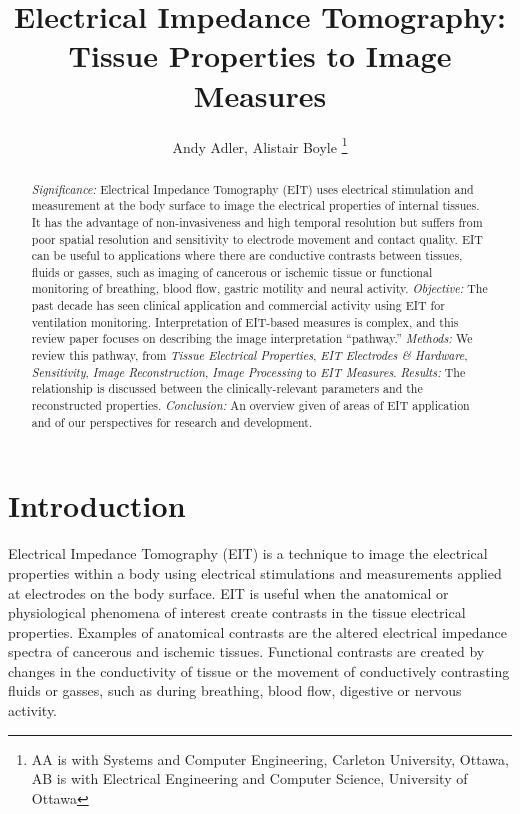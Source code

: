 \documentclass[10pt,journal]{IEEEtran}\def\TBLWIDA{15mm}\def\TBLWIDB{60mm}
\begin{document}
\title{Electrical Impedance Tomography:\\ Tissue Properties to Image Measures}
\author{Andy Adler, Alistair Boyle
\thanks{AA is with Systems and Computer Engineering, Carleton University, Ottawa, AB is with Electrical Engineering and Computer Science, University of Ottawa}
}
\date{}
\maketitle

\begin{abstract}
\emph{Significance:}
Electrical Impedance Tomography (EIT) uses electrical
stimulation and measurement at the body surface to
image the electrical properties of internal tissues.
It has the advantage of non-invasiveness and
high temporal resolution but suffers from poor spatial
resolution and sensitivity to electrode movement and
contact quality.
EIT can be useful to applications where there are conductive contrasts between
tissues, fluids or gasses, such as imaging of cancerous
or ischemic tissue or functional monitoring
of breathing, blood flow, gastric motility
and neural activity.
\emph{Objective:}
The past decade has seen clinical application and commercial
activity using EIT for ventilation monitoring.
Interpretation of EIT-based measures is complex, and
this review paper focuses on 
describing the image interpretation ``pathway.''
\emph{Methods:}
We review this pathway, from
{\em Tissue Electrical Properties},
{\em EIT Electrodes \& Hardware},
{\em Sensitivity},
{\em Image Reconstruction},
{\em Image Processing}
to 
{\em EIT Measures}.
\emph{Results:}
The relationship is discussed between the 
clinically-relevant parameters and the 
reconstructed properties.
\emph{Conclusion:}
An overview given of areas of EIT application 
and of our perspectives for
research and development.
\end{abstract}


\section{Introduction}

Electrical Impedance Tomography (EIT) is a technique to 
image the electrical properties within a body using
electrical stimulations and measurements applied at electrodes
on the body surface.
EIT is useful when the
anatomical or physiological phenomena of interest
create contrasts in the tissue electrical properties.
Examples of anatomical contrasts are 
the altered electrical impedance spectra of
cancerous \cite{Jossinet1998Breast} and
ischemic \cite{Packham2012Frequency} tissues.
Functional contrasts are created by changes
in the conductivity of tissue or the movement of
conductively contrasting fluids or gasses, such as during
breathing, blood flow, digestive or nervous activity.
\end{document}

